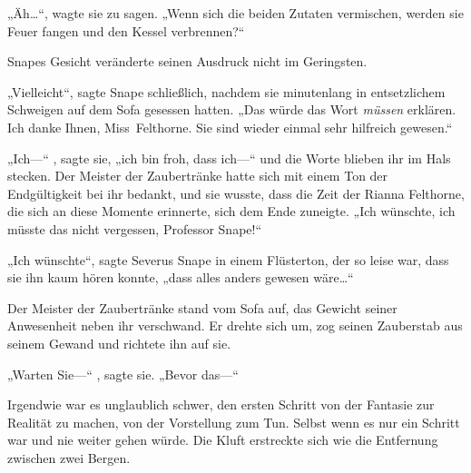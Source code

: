 „Äh…“, wagte sie zu sagen. „Wenn sich die beiden Zutaten vermischen, werden sie Feuer fangen und den Kessel verbrennen?“

Snapes Gesicht veränderte seinen Ausdruck nicht im Geringsten.

„Vielleicht“, sagte Snape schließlich, nachdem sie minutenlang in entsetzlichem Schweigen auf dem Sofa gesessen hatten. „Das würde das Wort \emph{müssen} erklären. Ich danke Ihnen, Miss~Felthorne. Sie sind wieder einmal sehr hilfreich gewesen.“

„Ich—“ , sagte sie, „ich bin froh, dass ich—“ und die Worte blieben ihr im Hals stecken. Der Meister der Zaubertränke hatte sich mit einem Ton der Endgültigkeit bei ihr bedankt, und sie wusste, dass die Zeit der Rianna Felthorne, die sich an diese Momente erinnerte, sich dem Ende zuneigte. „Ich wünschte, ich müsste das nicht vergessen, Professor Snape!“

„Ich wünschte“, sagte Severus Snape in einem Flüsterton, der so leise war, dass sie ihn kaum hören konnte, „dass alles anders gewesen wäre…“

Der Meister der Zaubertränke stand vom Sofa auf, das Gewicht seiner Anwesenheit neben ihr verschwand. Er drehte sich um, zog seinen Zauberstab aus seinem Gewand und richtete ihn auf sie.

„Warten Sie—“ , sagte sie. „Bevor das—“

Irgendwie war es unglaublich schwer, den ersten Schritt von der Fantasie zur Realität zu machen, von der Vorstellung zum Tun. Selbst wenn es nur ein Schritt war und nie weiter gehen würde. Die Kluft erstreckte sich wie die Entfernung zwischen zwei Bergen.

